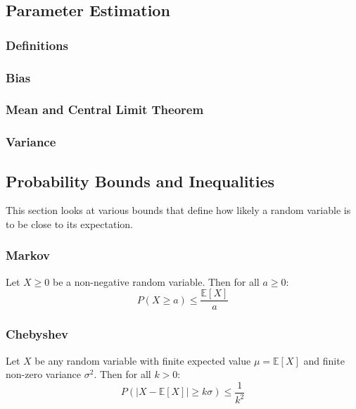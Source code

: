 \documentclass[twoside,twocolumn]{article}
\begin{document}
\subsection{Parameter Estimation}




\subsubsection{Definitions}
\subsubsection{Bias}
\subsubsection{Mean and Central Limit Theorem}
\subsubsection{Variance}







\subsection{Probability Bounds and Inequalities}
This section looks at various bounds that define how likely a random variable
is to be close to its expectation.
\subsubsection{Markov}
Let $X \geq 0$ be a non-negative random variable. Then for all $a \geq 0$:
\begin{equation}
  P(X \geq a) \leq \frac{\mathbb{E}[X]}{a}
\end{equation}
\subsubsection{Chebyshev}
Let $X$ be any random variable with finite expected value $\mu = \mathbb{E}[X]$
and finite non-zero variance $\sigma^2$.
Then for all $k > 0$:
\begin{equation}
  P(|X - \mathbb{E}[X]| \geq k \sigma) \leq \frac{1}{k^2}
\end{equation}
\end{document}
